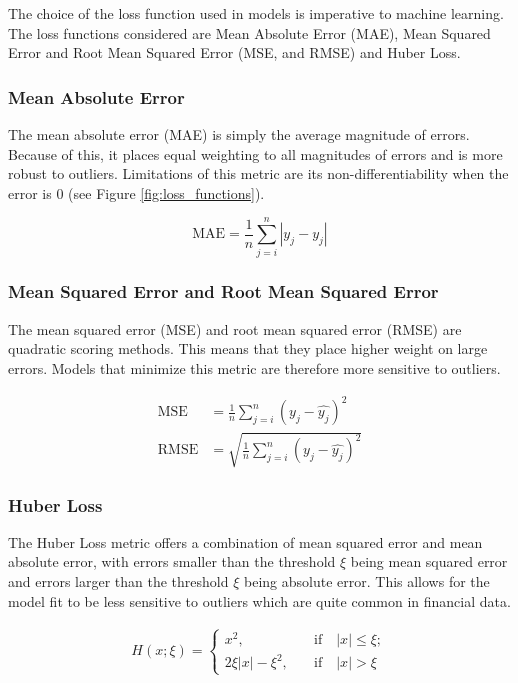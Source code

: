 \documentclass[a4paper]{article}
\begin{document}
The choice of the loss function used in models is imperative to machine learning. The loss functions considered are Mean Absolute Error (MAE), Mean Squared Error and Root Mean Squared Error (MSE, and RMSE) and Huber Loss.

\subsubsection{Mean Absolute Error}

The mean absolute error (MAE) is simply the average magnitude of errors. Because of this, it places equal weighting to all magnitudes of errors and is more robust to outliers. Limitations of this metric are its non-differentiability when the error is 0 (see Figure \ref{fig:loss_functions}).

\begin{equation}
	\text{MAE} = \frac{1}{n} \sum_{j = i}^{n} |y_j - \hat{y_j}|
\end{equation}

\subsubsection{Mean Squared Error and Root Mean Squared Error}

The mean squared error (MSE) and root mean squared error (RMSE) are quadratic scoring methods. This means that they place higher weight on large errors. Models that minimize this metric are therefore more sensitive to outliers. 

\begin{align}
	\text{MSE} &= \frac{1}{n} \sum_{j = i}^{n} \left( y_j - \hat{y_j}\right) ^2 \\
	\text{RMSE} &= \sqrt{ \frac{1}{n} \sum_{j = i}^{n} \left( y_j - \hat{y_j}\right) ^2}
\end{align}

\subsubsection{Huber Loss}

The Huber Loss metric \citep{huber_robust_1992} offers a combination of mean squared error and mean absolute error, with errors smaller than the threshold $\xi$ being mean squared error and errors larger than the threshold $\xi$ being absolute error. This allows for the model fit to be less sensitive to outliers which are quite common in financial data. 

\begin{align}
	H(x;\xi) = 
		\begin{cases}
		x^2, 
		\quad &\text{if} \quad |x| \leq \xi ; \\
		2 \xi  |x| - \xi^2, 
		\quad &\text{if} \quad |x| > \xi
	\end{cases}
\end{align}
\end{document}
